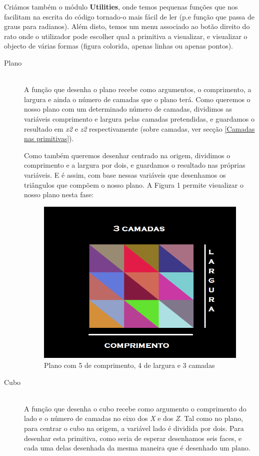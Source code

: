 \documentclass[a5paper,onecolumn, 11pt]{article}
\begin{document}
Criámos também o módulo \textbf{Utilities}, onde temos pequenas funções que nos facilitam na escrita do código tornado-o mais fácil de ler (p.e função que passa de graus para radianos). Além disto, temos um menu associado ao botão direito do rato onde o utilizador pode escolher qual a primitiva a visualizar, e visualizar o objecto de várias formas (figura colorida, apenas linhas ou apenas pontos).
\newpage
\begin{description}
	\item[Plano] \hfill \\
	A função que desenha o plano recebe como argumentos, o comprimento, a largura e ainda o número de camadas que o plano terá. Como queremos o nosso plano com um determinado número de camadas, dividimos as variáveis comprimento e largura pelas camadas pretendidas,  e guardamos o resultado em \textit{x2} e \textit{z2} respectivamente (sobre camadas, ver secção \ref{Camadas nas primitivas}).

	Como também queremos desenhar centrado na origem, dividimos o comprimento e a largura  por dois, e guardamos o resultado nas próprias variáveis. E é assim, com base nessas variáveis  que desenhamos os triângulos que compõem o nosso plano.
	A Figura 1 permite visualizar o nosso plano nesta fase:
	\begin{figure}[h!b!t!]
		\centering
		\includegraphics[scale=0.29]{plano.png}
		\caption{Plano com 5 de comprimento, 4 de largura e 3 camadas}
	\end{figure}
	\clearpage
	
	\item[Cubo] \hfill \\
	A função que desenha o cubo recebe como argumento o comprimento do lado e o número de camadas no eixo dos \textit{X} e dos \textit{Z}. Tal como no plano, para centrar o cubo na origem, a variável lado é dividida por dois. Para desenhar esta primitiva, como seria de esperar desenhamos seis faces, e cada uma delas desenhada da mesma maneira que é desenhado um plano.
	

\end{description}
\end{document}
